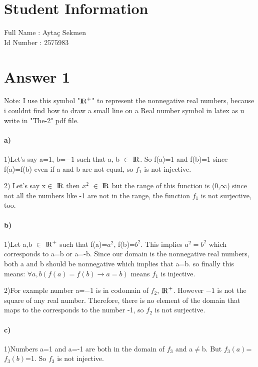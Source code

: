 \documentclass[12pt]{article}
\begin{document}
\section*{Student Information } 
Full Name :  Aytaç Sekmen \\
Id Number :  2575983 \\

\section*{Answer 1}
Note: I use this symbol "${\rm I\!R}^+$"  to represent the nonnegative real numbers, because i couldnt find how to draw a small line on a Real number symbol in latex as u write in "The-2" pdf file.
\paragraph{a)} %
1)Let's say a=1, b=$-1$  such that a, b $\in $ ${\rm I\!R}$. So f(a)=1 and f(b)=1 since f(a)=f(b) even if a and b are not equal, so $f_{1}$ is not injective. 

2) Let's say x$\in $ ${\rm I\!R}$ then $x^2$ $\in $ ${\rm I\!R}$ but the range of this function is (0,$\infty$) since not all the numbers like -1 are not in the range, the function  $f_{1}$ is not surjective, too.


\paragraph{b)} %

1)Let a,b $\in$ ${\rm I\!R}^+$ such that f(a)=$a^2$, f(b)=$b^2$. This implies $a^2=b^2$ which corresponds to a=b or a=-b. Since our domain is the nonnegative real numbers, both a and b should be nonnegative which implies that a=b. so finally this means: $\forall a,b(f(a)=f(b)\rightarrow a=b)$ means $f_1$ is injective. 

2)For example number a=$-1$ is in codomain of $f_2$, ${\rm I\!R}^+$. However $-1$ is not the square of any real number. Therefore, there is no element of the domain that maps to the corresponds to the number -1, so $f_2$ is not surjective.


\paragraph{c)}
1)Numbers a=1 and a=-1 are both in the domain of $f_3$ and a$\neq$b. But $f_3(a)$=$f_3(b)$=1. So $f_3$ is not injective.
\end{document}
